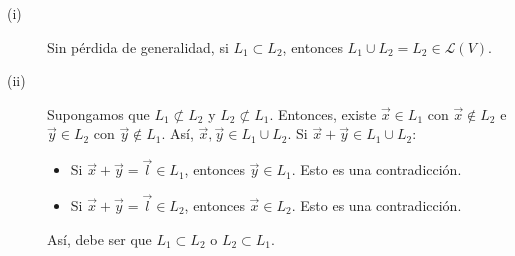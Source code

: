 \documentclass{article}
\begin{document}
\begin{sol}
\begin{description}
\item[(i)] Sin pérdida de generalidad, si $\displaystyle L_{1} \subset L_{2} $, entonces $\displaystyle L_{1}\cup L_{2} = L_{2} \in \mathcal{L}\left(V\right) $.
\item[(ii)] Supongamos que $\displaystyle L_{1} \not \subset L_{2} $ y $\displaystyle L_{2} \not \subset L_{1} $. Entonces, existe $\displaystyle \vec{x} \in L_{1} $ con $\displaystyle \vec{x} \not\in L_{2} $ e $\displaystyle \vec{y} \in L_{2} $ con $\displaystyle \vec{y}\not\in L_{1} $. Así, $\displaystyle \vec{x}, \vec{y} \in L_{1}\cup L_{2} $. Si $\displaystyle \vec{x}+\vec{y} \in L_{1}\cup L_{2} $:
\begin{itemize}
\item Si $\displaystyle \vec{x}+\vec{y} = \vec{l} \in L_{1} $, entonces $\displaystyle \vec{y} \in L_{1} $. Esto es una contradicción.
\item Si $\displaystyle \vec{x}+\vec{y} = \vec{l} \in L_{2} $, entonces $\displaystyle \vec{x} \in L_{2} $. Esto es una contradicción. 
\end{itemize}
Así, debe ser que $\displaystyle L_{1} \subset L_{2} $ o $\displaystyle L_{2}\subset L_{1} $.
\end{description}
\end{sol}
\end{document}
